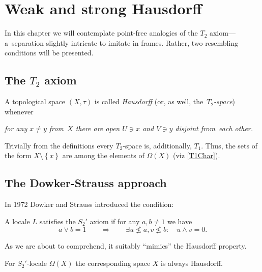 \chapter{Weak and strong Hausdorff}

In this chapter we will contemplate point-free analogies of the $T_2$
axiom---a~separation slightly intricate to imitate in frames.
Rather, two resembling conditions will be presented.

\section{The $T_2$ axiom}

\begin{framed}
  \begin{df}[$T_2$]
    A topological space $(X, \tau)$ is called \emph{Hausdorff\/} (or, as well,
    the~\emph{$T_2$-space\/}) whenever
    \begin{center} \it
      for any $x \ne y$ from~$X$ there are open $U\owns x$ and $V\owns y$
      disjoint from~each other.
    \end{center}
  \end{df}
\end{framed}

\begin{rem} \label{T2->T1}
  Trivially from the definitions every $T_2$-space is, additionally, $T_1$.
  Thus, the sets of the form $X\setminus \left\{x\right\}$ are among the
  elements of $\Omega(X)$ (viz \ref{T1Char}).
\end{rem}

\section{The Dowker-Strauss approach}

In 1972 Dowker and Strauss \cite{ds72} introduced the condition:

\begin{framed}
  \begin{df}[$S_2'$]
    A locale $L$ satisfies the $S_2'$ axiom if for any $a, b \ne 1$ we have
    \[
      a \vee b = 1 \qquad \Rightarrow \qquad \exists u\not\leq a, v\not\leq
      b: \quad u \wedge v = 0.
    \]
  \end{df}
\end{framed}

As we are about to comprehend, it suitably ``mimics'' the Hausdorff property.

\begin{prop} \label{S2'->Haus}
  For $S_2'$-locale $\Omega(X)$ the corresponding space $X$ is always
  Hausdorff.
\end{prop}

